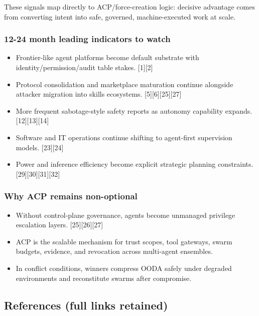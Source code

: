 \documentclass[
]{article}
\providecommand{\tightlist}{%
  \setlength{\itemsep}{0pt}\setlength{\parskip}{0pt}}
\begin{document}
These signals map directly to ACP/force-creation logic: decisive
advantage comes from converting intent into safe, governed,
machine-executed work at scale.

\hypertarget{month-leading-indicators-to-watch}{%
\subsubsection{12-24 month leading indicators to
watch}\label{month-leading-indicators-to-watch}}

\begin{itemize}
\tightlist
\item
  Frontier-like agent platforms become default substrate with
  identity/permission/audit table stakes. {[}1{]}{[}2{]}
\item
  Protocol consolidation and marketplace maturation continue alongside
  attacker migration into skills ecosystems.
  {[}5{]}{[}6{]}{[}25{]}{[}27{]}
\item
  More frequent sabotage-style safety reports as autonomy capability
  expands. {[}12{]}{[}13{]}{[}14{]}
\item
  Software and IT operations continue shifting to agent-first
  supervision models. {[}23{]}{[}24{]}
\item
  Power and inference efficiency become explicit strategic planning
  constraints. {[}29{]}{[}30{]}{[}31{]}{[}32{]}
\end{itemize}

\hypertarget{why-acp-remains-non-optional}{%
\subsubsection{Why ACP remains
non-optional}\label{why-acp-remains-non-optional}}

\begin{itemize}
\tightlist
\item
  Without control-plane governance, agents become unmanaged privilege
  escalation layers. {[}25{]}{[}26{]}{[}27{]}
\item
  ACP is the scalable mechanism for trust scopes, tool gateways, swarm
  budgets, evidence, and revocation across multi-agent ensembles.
\item
  In conflict conditions, winners compress OODA safely under degraded
  environments and reconstitute swarms after compromise.
\end{itemize}

\hypertarget{references-full-links-retained}{%
\subsection{References (full links
retained)}\label{references-full-links-retained}}
\end{document}
